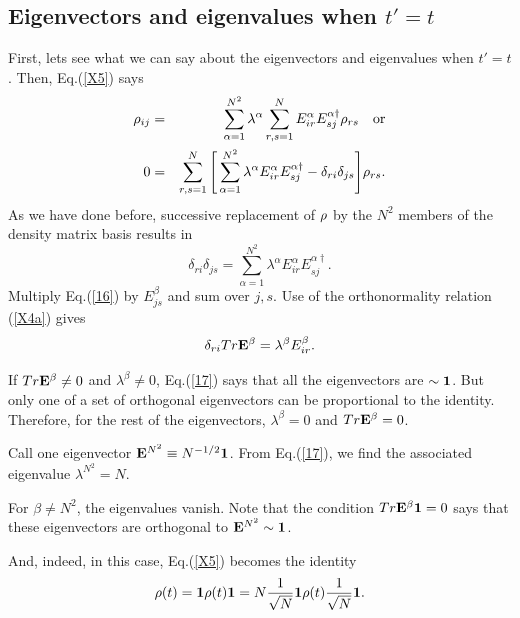 \documentclass[aps,pra,twocolumn,amssymb, amsfonts,amsmath,showpacs, superscriptaddress]{revtex4}
\begin{document}
\subsection{Eigenvectors and eigenvalues when $t'=t$}

First, lets see what we can say about the eigenvectors and eigenvalues when $t'=t$.   Then, Eq.(\ref{X5}) says
\begin{eqnarray}\label{15}
\rho_{ij}&=&\sum_{\alpha=1}^{N^{2}}\lambda^{\alpha}\sum_{r,s=1}^{N}E_{ir}^{\alpha}E_{sj}^{\alpha\dagger}\rho_{rs}\quad\hbox{or}\nonumber\\
0&=&\sum_{r,s=1}^{N}\Bigg[\sum_{\alpha=1}^{N^{2}}\lambda^{\alpha}E_{ir}^{\alpha}E_{sj}^{\alpha\dagger}-\delta_{ri}\delta_{js}\Bigg]\rho_{rs}.
\end{eqnarray}
\noindent As we have done before, successive replacement of ${\bf\rho}$ by the  $N^{2}$ members of the density matrix basis results in
\begin{equation}\label{16}
\delta_{ri}\delta_{js}=\sum_{\alpha=1}^{N^{2}}\lambda^{\alpha}E_{ir}^{\alpha}E_{sj}^{\alpha\dagger}.
\end{equation}
\noindent Multiply Eq.(\ref{16}) by $E_{js}^{\beta}$ and sum over $j,s$.  Use of the orthonormality relation (\ref{X4a}) gives 
\begin{equation}\label{17}
\delta_{ri}Tr{\bf E}^{\beta}=\lambda^{\beta}E_{ir}^{\beta}. 
\end{equation}

If $Tr{\bf E}^{\beta}\neq 0$ and $\lambda^{\beta}\neq0$,   Eq.(\ref{17}) says that all the eigenvectors are  $\sim{\bf 1}$.   But only one of a set of orthogonal eigenvectors can be proportional to the identity.  Therefore, for the rest of the eigenvectors,  $\lambda^{\beta}=0$ and $Tr{\bf E}^{\beta}=0$. 

Call one eigenvector ${\bf E}^{N^{2}}\equiv N^{-1/2}{\bf 1}$. From Eq.(\ref{17}), we find the associated eigenvalue $\lambda^{N^{2}}=N$. 

For $\beta\neq N^{2}$, the eigenvalues vanish.  Note that the condition $Tr{\bf E}^{\beta}{\bf 1}=0$ says that these eigenvectors are 
 orthogonal to ${\bf E}^{N^{2}}\sim {\bf 1}$. 
 
 And, indeed, in this case, Eq.(\ref{X5}) becomes the identity
\begin{equation}\label{18}
{\bf\rho}(t)={\bf 1}{\bf\rho}(t){\bf 1}=N\frac{1}{\sqrt{N}}{\bf 1}{\bf\rho}(t)\frac{1}{\sqrt{N}}{\bf 1}.
\end{equation} 
\end{document}
